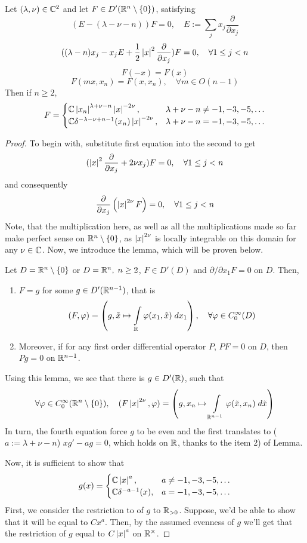 \documentclass[10pt]{article} %
\begin{document}
\begin{myprop}
	Let $(\lambda,\nu)\in\mathbb{C}^2$ and let $F\in D'(\mathbb{R}^n\setminus\left\{0\right\})$, satisfying
	\[(E-(\lambda-\nu-n))F=0,\quad E:=\sum_jx_j\frac{\partial}{\partial x_j}\]
	\[((\lambda-n)x_j-x_jE+\frac{1}{2}\left|x\right|^2\frac{\partial}{\partial x_j})F=0,\quad\forall1\leq j<n\]
	\[F(-x)=F(x)\]
	\[F(mx,x_n)=F(x,x_n),\quad \forall m\in O(n-1)\]
	Then if $n\geq2$,
	\[F=\begin{cases}
		\mathbb{C}\left|x_n\right|^{\lambda+\nu-n}\left|x\right|^{-2\nu},&\lambda+\nu-n\neq-1,-3,-5,\hdots\\
		\mathbb{C}\delta^{-\lambda-\nu+n-1}(x_n)\left|x\right|^{-2\nu},&\lambda+\nu-n=-1,-3,-5,\hdots
	\end{cases}\]
	\end{myprop}
	\begin{proof}
		To begin with, substitute first equation into the second to get
		\[(\left|x\right|^2\frac{\partial}{\partial x_j}+2\nu x_j)F=0,\quad\forall1\leq j<n\]
		and consequently
		\[\frac{\partial}{\partial x_j}\left(\left|x\right|^{2\nu} F\right)=0,\quad\forall1\leq j<n\]
		Note, that the multiplication here, as well as all the multiplications made so far make perfect sense on $\mathbb{R}^n\setminus
		\left\{0\right\}$, as $\left|x\right|^{2\nu}$ is locally integrable on this domain for any $\nu\in\mathbb{C}$.
		Now, we introduce the lemma, which will be proven below.
		\begin{mylem}
			Let $D=\mathbb{R}^n\setminus\left\{0\right\}$ or $D=\mathbb{R}^n,\;n\geq2$,
			$F\in D'(D)$ and $\partial/\partial x_1F=0$ on $D$. Then,
			\begin{enumerate}
				\item $F=g$ for some $g\in D'(\mathbb{R}^{n-1})$, that is
			\[(F,\phi)=\mybra{g,\tilde{x}\mapsto\int_\R\phi(x_1,\tilde{x})\;dx_1},\quad\forall \phi\in C^\infty_0(D)\]
				\item Moreover, if for any first order differential operator $P$, $PF=0$ on $D$, then $Pg=0$ on $\mathbb{R}^{n-1}$.
			\end{enumerate}
		\end{mylem}
		Using this lemma, we see that there is $g\in D'(\mathbb{R})$, such that 
		\[\forall \phi\in C^\infty_0(\R^n\setminus\mycbra{0}),\quad (F\myabs{x}^{2\nu}
		,\phi)=\mybra{g,x_n\mapsto\int_{\R^{n-1}}\phi(\tilde{x},x_n)\;d\tilde{x}} \]
		In turn, the fourth equation force $g$ to be even and the first translates to ($a:=\lambda+\nu-n$)
		$xg'-ag=0$, which holds on $\mathbb{R}$, thanks to the item 2) of Lemma.

		Now, it is sufficient to show that
		\[g(x)=\begin{cases}
		\mathbb{C}\left|x\right|^a,&a\neq-1,-3,-5,\hdots\\
		\mathbb{C}\delta^{-a-1}(x),&a=-1,-3,-5,\hdots
		\end{cases}\]
		First, we consider the restriction to of $g$ to $\mathbb{R}_{>0}$. Suppose, we'd be able to show that it will be equal to
		$Cx^a$. Then, by the assumed evenness of $g$ we'll get that the restriction of $g$ equal to $C\left|x\right|^a$ on $\mathbb{R}^\times$.
	\end{proof}
\end{document}
